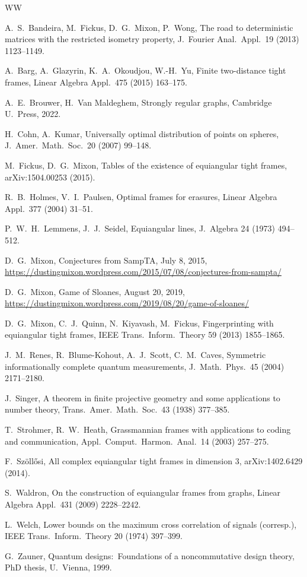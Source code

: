\documentclass{article}
\theoremstyle{plain}
\theoremstyle{definition}
\begin{document}
\begin{thebibliography}{WW}

A.\ S.\ Bandeira, M.\ Fickus, D.\ G.\ Mixon, P.\ Wong, 
The road to deterministic matrices with the restricted isometry property, 
J.\ Fourier Anal.\ Appl.\ 19 (2013) 1123--1149.

A.\ Barg, A.\ Glazyrin, K.\ A.\ Okoudjou, W.-H.\ Yu,
Finite two-distance tight frames,
Linear Algebra Appl.\ 475 (2015) 163--175.

A.\ E.\ Brouwer, H.\ Van Maldeghem, Strongly regular graphs,
Cambridge U.\ Press, 2022.

H.\ Cohn, A.\ Kumar,
Universally optimal distribution of points on spheres,
J.\ Amer.\ Math.\ Soc.\ 20 (2007) 99--148.

M.\ Fickus, D.\ G.\ Mixon, 
Tables of the existence of equiangular tight frames,
arXiv:1504.00253 (2015).

R.\ B.\ Holmes, V.\ I.\ Paulsen,
Optimal frames for erasures,
Linear Algebra Appl.\ 377 (2004) 31--51.

P.\ W.\ H.\ Lemmens, J.\ J.\ Seidel, 
Equiangular lines, 
J.\ Algebra 24 (1973) 494--512.

D.\ G.\ Mixon,
Conjectures from SampTA,
July 8, 2015,
\url{https://dustingmixon.wordpress.com/2015/07/08/conjectures-from-sampta/}

D.\ G.\ Mixon,
Game of Sloanes,
August 20, 2019,
\url{https://dustingmixon.wordpress.com/2019/08/20/game-of-sloanes/}

D.\ G.\ Mixon, C.\ J.\ Quinn, N.\ Kiyavash, M.\ Fickus, 
Fingerprinting with equiangular tight frames, 
IEEE Trans.\ Inform.\ Theory 59 (2013) 1855--1865.

J.\ M.\ Renes, R.\ Blume-Kohout, A.\ J.\ Scott, C.\ M.\ Caves, 
Symmetric informationally complete quantum
measurements, 
J.\ Math.\ Phys.\ 45 (2004) 2171--2180.

J.\ Singer,
A theorem in finite projective geometry and some applications to number theory,
Trans.\ Amer.\ Math.\ Soc.\ 43 (1938) 377--385.

T.\ Strohmer, R.\ W.\ Heath,
Grassmannian frames with applications to coding and communication,
Appl.\ Comput.\ Harmon.\ Anal.\ 14 (2003) 257--275.

F.\ Sz\"oll\H{o}si,
All complex equiangular tight frames in dimension $3$,
arXiv:1402.6429 (2014).

S.\ Waldron,
On the construction of equiangular frames from graphs,
Linear Algebra Appl.\ 431 (2009) 2228--2242.

L.\ Welch,
Lower bounds on the maximum cross correlation of signals (corresp.),
IEEE Trans.\ Inform.\ Theory 20 (1974) 397--399.

G.\ Zauner, 
Quantum designs:\ Foundations of a noncommutative design theory, 
PhD thesis, U.\ Vienna, 1999.

\end{thebibliography}
\end{document}
